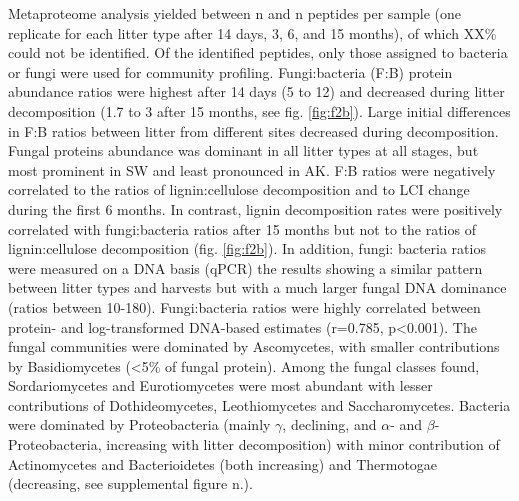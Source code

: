 Metaproteome analysis yielded between n and n peptides per sample (one replicate for each litter type after 14 days, 3, 6, and 15 months), of which XX\% could not be identified. Of the identified peptides, only those assigned to bacteria or fungi were used for community profiling. Fungi:bacteria (F:B) protein abundance ratios were highest after 14 days (5 to 12) and decreased during litter decomposition (1.7 to 3 after 15 months, see fig. \ref{fig:f2b}). Large initial differences in F:B ratios between litter from different sites decreased during decomposition. Fungal proteins abundance was dominant in all litter types at all stages, but most prominent in SW and least pronounced in  AK. F:B ratios were negatively correlated to the ratios of lignin:cellulose decomposition and to LCI change during the first 6 months. In contrast, lignin decomposition rates were positively correlated with fungi:bacteria ratios after 15 months but not to the ratios of lignin:cellulose decomposition (fig. \ref{fig:f2b}). In addition, fungi: bacteria ratios were measured on a DNA basis (qPCR) the results showing a similar pattern between litter types and harvests but with a much larger fungal DNA dominance (ratios between 10-180). Fungi:bacteria ratios were highly correlated between protein- and log-transformed DNA-based estimates (r=0.785, p\textless 0.001). The fungal communities were dominated by Ascomycetes, with smaller contributions by Basidiomycetes (<5\% of fungal protein).  Among the fungal classes found, Sordariomycetes and Eurotiomycetes were most abundant with lesser contributions of Dothideomycetes, Leothiomycetes and Saccharomycetes. Bacteria were dominated by Proteobacteria (mainly $\gamma$, declining, and $\alpha$- and $\beta$-Proteobacteria, increasing with litter decomposition) with minor contribution of Actinomycetes and Bacterioidetes (both increasing) and Thermotogae (decreasing, see supplemental figure n.).

